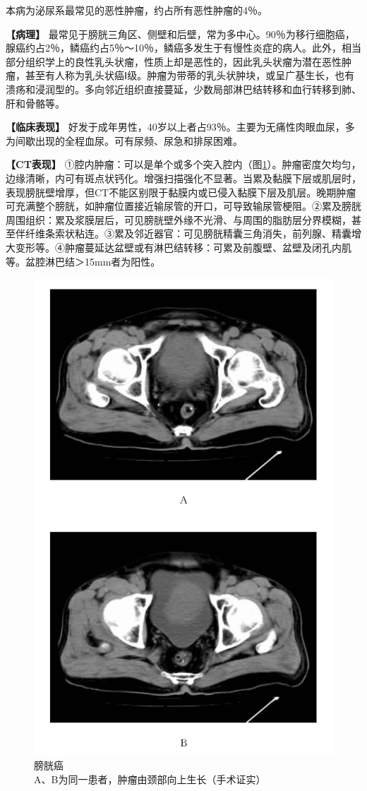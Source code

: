 本病为泌尿系最常见的恶性肿瘤，约占所有恶性肿瘤的4％。

\textbf{【病理】}
最常见于膀胱三角区、侧壁和后壁，常为多中心。90％为移行细胞癌，腺癌约占2％，鳞癌约占5％～10％，鳞癌多发生于有慢性炎症的病人。此外，相当部分组织学上的良性乳头状瘤，性质上却是恶性的，因此乳头状瘤为潜在恶性肿瘤，甚至有人称为乳头状癌Ⅰ级。肿瘤为带蒂的乳头状肿块，或呈广基生长，也有溃疡和浸润型的。多向邻近组织直接蔓延，少数局部淋巴结转移和血行转移到肺、肝和骨骼等。

\textbf{【临床表现】}
好发于成年男性，40岁以上者占93％。主要为无痛性肉眼血尿，多为间歇出现的全程血尿。可有尿频、尿急和排尿困难。

\textbf{【CT表现】}
①腔内肿瘤：可以是单个或多个突入腔内（图\ref{fig15-26}）。肿瘤密度欠均匀，边缘清晰，内可有斑点状钙化。增强扫描强化不显著。当累及黏膜下层或肌层时，表现膀胱壁增厚，但CT不能区别限于黏膜内或已侵入黏膜下层及肌层。晚期肿瘤可充满整个膀胱，如肿瘤位置接近输尿管的开口，可导致输尿管梗阻。②累及膀胱周围组织：累及浆膜层后，可见膀胱壁外缘不光滑、与周围的脂肪层分界模糊，甚至伴纤维条索状粘连。③累及邻近器官：可见膀胱精囊三角消失，前列腺、精囊增大变形等。④肿瘤蔓延达盆壁或有淋巴结转移：可累及前腹壁、盆壁及闭孔内肌等。盆腔淋巴结＞15mm者为阳性。

\begin{figure}[!htbp]
 \centering
 \includegraphics[width=.7\textwidth,height=\textheight,keepaspectratio]{./images/Image00343.jpg}
 \captionsetup{justification=centering}
 \caption{膀胱癌\\{\small A、B为同一患者，肿瘤由颈部向上生长（手术证实）}}
 \label{fig15-26}
  \end{figure} 

